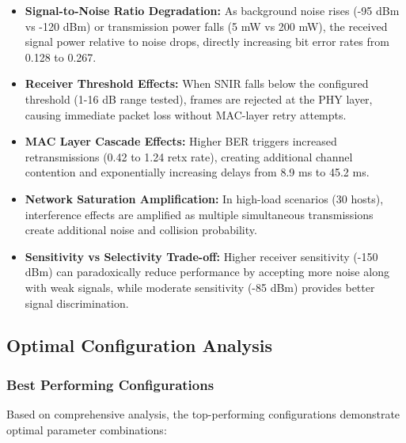 \documentclass{article}
\begin{document}
\begin{itemize}

  \item \textbf{Signal-to-Noise Ratio Degradation:} As background noise rises (-95 dBm vs -120 dBm) or transmission power falls (5 mW vs 200 mW), the received signal power relative to noise drops, directly increasing bit error rates from 0.128 to 0.267.

  

  \item \textbf{Receiver Threshold Effects:} When SNIR falls below the configured threshold (1-16 dB range tested), frames are rejected at the PHY layer, causing immediate packet loss without MAC-layer retry attempts.

  

  \item \textbf{MAC Layer Cascade Effects:} Higher BER triggers increased retransmissions (0.42 to 1.24 retx rate), creating additional channel contention and exponentially increasing delays from 8.9 ms to 45.2 ms.

  

  \item \textbf{Network Saturation Amplification:} In high-load scenarios (30 hosts), interference effects are amplified as multiple simultaneous transmissions create additional noise and collision probability.

  

  \item \textbf{Sensitivity vs Selectivity Trade-off:} Higher receiver sensitivity (-150 dBm) can paradoxically reduce performance by accepting more noise along with weak signals, while moderate sensitivity (-85 dBm) provides better signal discrimination.

\end{itemize}

\subsection{Optimal Configuration Analysis}

\subsubsection{Best Performing Configurations}

Based on comprehensive analysis, the top-performing configurations demonstrate optimal parameter combinations:
\end{document}
